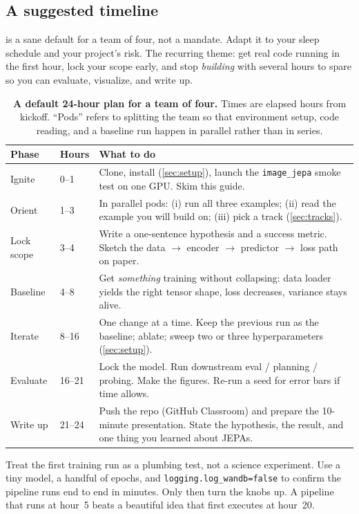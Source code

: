 \documentclass{article}
\newcommand{\code}[1]{\texttt{\small #1}}
\begin{document}
\subsection{A suggested timeline}

 is a sane default for a team of four, not a mandate. Adapt it
to your sleep schedule and your project's risk. The recurring theme: get real
code running in the first hour, lock your scope early, and stop \emph{building}
with several hours to spare so you can evaluate, visualize, and write up.

\begin{table}[h]
\centering
\caption{\textbf{A default 24-hour plan for a team of four.} Times are elapsed
hours from kickoff. ``Pods'' refers to splitting the team so that environment
setup, code reading, and a baseline run happen in parallel rather than in
series.}
\label{tab:timeline}
\small
\begin{tabular}{llp{8.4cm}}
\toprule
Phase & Hours & What to do \\
\midrule
Ignite      & 0--1   & Clone, install (\cref{sec:setup}), launch the \code{image\_jepa} smoke test on one GPU. Skim this guide. \\
Orient      & 1--3   & In parallel pods: (i) run all three examples; (ii) read the example you will build on; (iii) pick a track (\cref{sec:tracks}). \\
Lock scope  & 3--4   & Write a one-sentence hypothesis and a success metric. Sketch the data $\to$ encoder $\to$ predictor $\to$ loss path on paper. \\
Baseline    & 4--8   & Get \emph{something} training without collapsing: data loader yields the right tensor shape, loss decreases, variance stays alive. \\
Iterate     & 8--16  & One change at a time. Keep the previous run as the baseline; ablate; sweep two or three hyperparameters (\cref{sec:setup}). \\
Evaluate    & 16--21 & Lock the model. Run downstream eval / planning / probing. Make the figures. Re-run a seed for error bars if time allows. \\
Write up    & 21--24 & Push the repo (GitHub Classroom) and prepare the 10-minute presentation. State the hypothesis, the result, and one thing you learned about JEPAs. \\
\bottomrule
\end{tabular}
\end{table}

\begin{tipbox}
Treat the first training run as a plumbing test, not a science experiment. Use a
tiny model, a handful of epochs, and \code{logging.log\_wandb=false} to confirm the
pipeline runs end to end in minutes. Only then turn the knobs up. A pipeline that
runs at hour~5 beats a beautiful idea that first executes at hour~20.
\end{tipbox}
\end{document}

